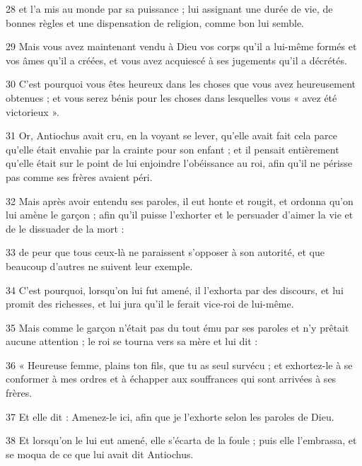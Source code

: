 \par 28 et l'a mis au monde par sa puissance ; lui assignant une durée de vie, de bonnes règles et une dispensation de religion, comme bon lui semble.

\par 29 Mais vous avez maintenant vendu à Dieu vos corps qu'il a lui-même formés et vos âmes qu'il a créées, et vous avez acquiescé à ses jugements qu'il a décrétés.

\par 30 C'est pourquoi vous êtes heureux dans les choses que vous avez heureusement obtenues ; et vous serez bénis pour les choses dans lesquelles vous « avez été victorieux ».

\par 31 Or, Antiochus avait cru, en la voyant se lever, qu'elle avait fait cela parce qu'elle était envahie par la crainte pour son enfant ; et il pensait entièrement qu'elle était sur le point de lui enjoindre l'obéissance au roi, afin qu'il ne périsse pas comme ses frères avaient péri.

\par 32 Mais après avoir entendu ses paroles, il eut honte et rougit, et ordonna qu'on lui amène le garçon ; afin qu'il puisse l'exhorter et le persuader d'aimer la vie et de le dissuader de la mort :

\par 33 de peur que tous ceux-là ne paraissent s'opposer à son autorité, et que beaucoup d'autres ne suivent leur exemple.

\par 34 C'est pourquoi, lorsqu'on lui fut amené, il l'exhorta par des discours, et lui promit des richesses, et lui jura qu'il le ferait vice-roi de lui-même.

\par 35 Mais comme le garçon n'était pas du tout ému par ses paroles et n'y prêtait aucune attention ; le roi se tourna vers sa mère et lui dit :

\par 36 « Heureuse femme, plains ton fils, que tu as seul survécu ; et exhortez-le à se conformer à mes ordres et à échapper aux souffrances qui sont arrivées à ses frères.

\par 37 Et elle dit : Amenez-le ici, afin que je l'exhorte selon les paroles de Dieu.

\par 38 Et lorsqu'on le lui eut amené, elle s'écarta de la foule ; puis elle l'embrassa, et se moqua de ce que lui avait dit Antiochus.

